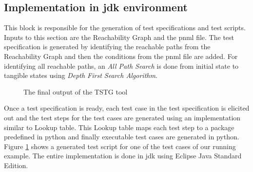 \subsection{Implementation in \gls{jdk} environment}
This block is responsible for the generation of test specifications and test scripts. Inputs to this section are the Reachability Graph and the \gls{pnml} file. The test specification is generated by identifying the reachable paths from the Reachability Graph and then the conditions from the \gls{pnml} file are added. For identifying all reachable paths, an \textit{All Path Search} is done from initial state to tangible states using \textit{Depth First Search Algorithm}.

\begin{figure}[htb!]
\centering
{}
\caption{The final output of the TSTG tool}
\label{fig:testscript}
\end{figure}

Once a test specification is ready, each test case in the test specification is elicited out and the test steps for the test cases are generated using an implementation similar to Lookup table. This Lookup table maps each test step to a package predefined in python and finally executable test cases are generated in python. Figure \ref{fig:testscript} shows a generated test script for one of the test cases of our running example. The entire implementation is done in \gls{jdk} using Eclipse Java Standard Edition.
